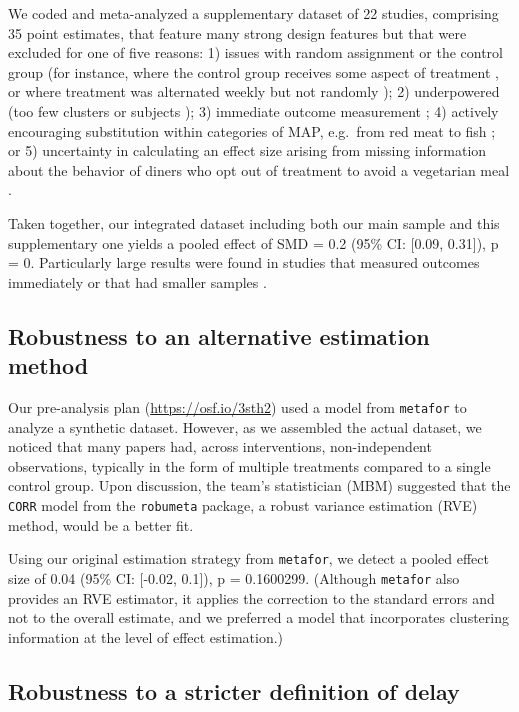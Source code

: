 \documentclass[sn-nature,referee,pdflatex]{sn-jnl}
\begin{document}
We coded and meta-analyzed a supplementary dataset of 22 studies,
comprising 35 point estimates, that feature many strong design features
but that were excluded for one of five reasons: 1) issues with random
assignment or the control group (for instance, where the control group
receives some aspect of treatment \citep{piazza2022}, or where treatment
was alternated weekly but not randomly \citep{garnett2020}); 2)
underpowered (too few clusters \citep{reinders2017} or subjects
\citep{lentz2019}); 3) immediate outcome measurement
\citep{dannenberg2023, sparkman2017, griesoph2021, hansen2021}; 4)
actively encouraging substitution within categories of MAP, e.g.~from
red meat to fish \citep{celis2017, johansen2009}; or 5) uncertainty in
calculating an effect size arising from missing information about the
behavior of diners who opt out of treatment to avoid a vegetarian meal
\citep{betterfoodfoundation2023}.

Taken together, our integrated dataset including both our main sample
and this supplementary one yields a pooled effect of SMD = 0.2 (95\% CI:
{[}0.09, 0.31{]}), p = 0. Particularly large results were found in
studies that measured outcomes immediately \citep{hansen2021} or that
had smaller samples \citep{lentz2020}.

\subsection{Robustness to an alternative estimation
method}\label{Sec5.1.2}

Our pre-analysis plan (\url{https://osf.io/3sth2}) used a model from
\texttt{metafor} to analyze a synthetic dataset. However, as we
assembled the actual dataset, we noticed that many papers had, across
interventions, non-independent observations, typically in the form of
multiple treatments compared to a single control group. Upon discussion,
the team's statistician (MBM) suggested that the \texttt{CORR} model
from the \texttt{robumeta} package, a robust variance estimation (RVE)
method, would be a better fit.

Using our original estimation strategy from \texttt{metafor}, we detect
a pooled effect size of 0.04 (95\% CI: {[}-0.02, 0.1{]}), p = 0.1600299.
(Although \texttt{metafor} also provides an RVE estimator, it applies
the correction to the standard errors and not to the overall estimate,
and we preferred a model that incorporates clustering information at the
level of effect estimation.)

\subsection{Robustness to a stricter definition of
delay}\label{Sec5.1.3}
\end{document}
